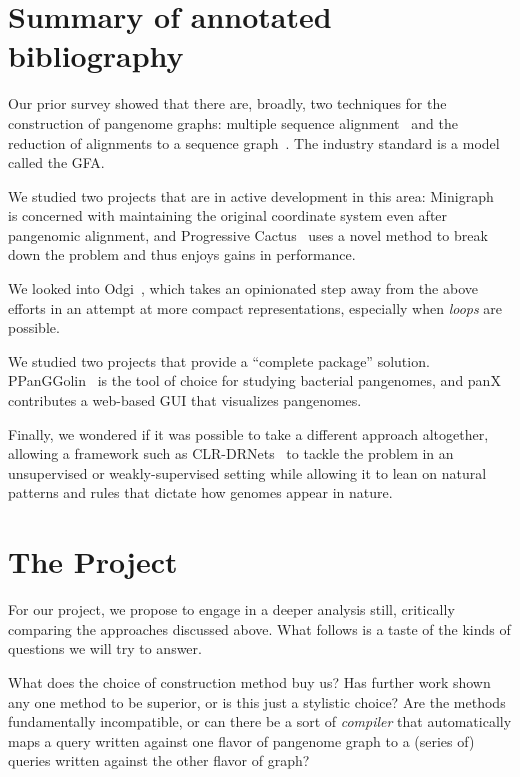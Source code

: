 \documentclass[acmsmall, screen]{acmart}
\begin{document}
\section{Summary of annotated bibliography}

Our prior survey showed that there are, broadly, two techniques for the construction of pangenome graphs: multiple sequence alignment~\cite{poa} and
the reduction of alignments to a sequence graph~\cite{genome_alignment}.
The industry standard is a model called the GFA.

We studied two projects that are in active development in this area: Minigraph~\cite{minigraph} is concerned with maintaining the original coordinate system even after pangenomic alignment, and Progressive Cactus~\cite{genome_alignment} uses a novel method to break down the problem and thus enjoys gains in performance.

We looked into Odgi~\cite{odgi}, which takes an opinionated step away from the above efforts in an attempt at more compact representations, especially when \emph{loops} are possible.

We studied two projects that provide a ``complete package'' solution.
PPanGGolin~\cite{pangolin} is the tool of choice for studying bacterial pangenomes, and panX~\cite{panx} contributes a web-based GUI that visualizes pangenomes.

Finally, we wondered if it was possible to take a different approach altogether, allowing a framework such as CLR-DRNets~\cite{clrdrnets}
to tackle the problem in an unsupervised or weakly-supervised setting while allowing it to lean on natural patterns and rules that dictate how genomes appear in nature.

\section{The Project}

For our project, we propose to engage in a deeper analysis still, critically comparing the approaches discussed above.
What follows is a taste of the kinds of questions we will try to answer.

What does the choice of construction method buy us?
Has further work shown any one method to be superior, or is this just a stylistic choice?
Are the methods fundamentally incompatible, or can there be a sort of \emph{compiler} that automatically maps a query written against one flavor of pangenome graph to a (series of) queries written against the other flavor of graph?
\end{document}
